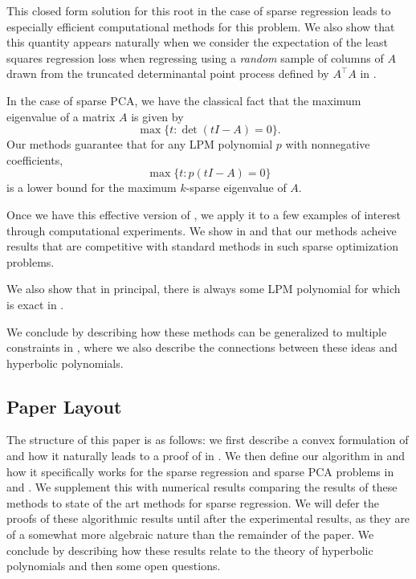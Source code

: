 \documentclass{amsart}
\theoremstyle{definition}
\begin{document}
This closed form solution for this root in the case of sparse regression leads to especially efficient computational methods for this problem.
We also show that this quantity appears naturally when we consider the expectation of the least squares regression loss when regressing using a \emph{random} sample of columns of $A$ drawn from the truncated determinantal point process defined by $A^{\intercal}A$ in .

In the case of sparse PCA, we have the classical fact that the maximum eigenvalue of a matrix $A$ is given by
\[
    \max \{t : \det(tI - A) = 0\}.
\]
Our methods guarantee that for any LPM polynomial $p$ with nonnegative coefficients,
\[
    \max \{t : p(tI - A) = 0\}
\]
is a lower bound for the maximum $k$-sparse eigenvalue of $A$.

Once we have this effective version of , we apply it to a few examples of interest through computational experiments.
We show in  and  that our methods acheive results that are competitive with standard methods in such sparse optimization problems.

We also show that in principal, there is always some LPM polynomial for which  is exact in .

We conclude by describing how these methods can be generalized to multiple constraints in , where we also describe the connections between these ideas and hyperbolic polynomials.

\subsection{Paper Layout}
The structure of this paper is as follows: we first describe a convex formulation of  and how it naturally leads to a proof of  in . We then define our algorithm in  and how it specifically works for the sparse regression and sparse PCA problems in  and . We supplement this with numerical results comparing the results of these methods to state of the art methods for sparse regression. We will defer the proofs of these algorithmic results until after the experimental results, as they are of a somewhat more algebraic nature than the remainder of the paper. We conclude by describing how these results relate to the theory of hyperbolic polynomials and then some open questions.
\end{document}
